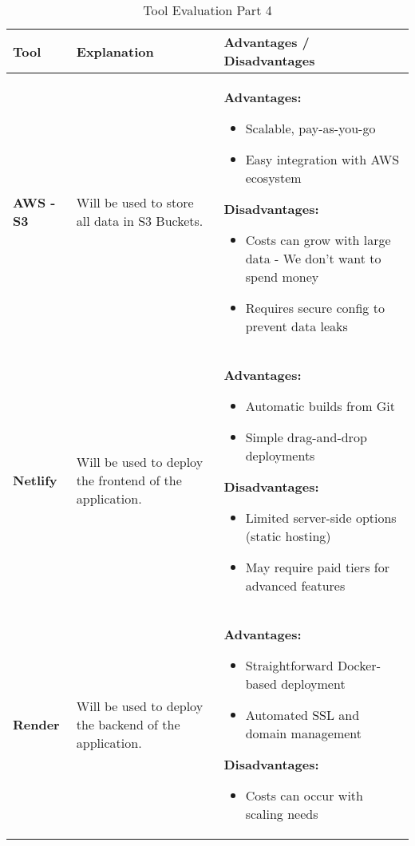 \documentclass{article}
\begin{document}
\begin{table}[htbp]
  \caption{Tool Evaluation Part 4}
  \label{TblToolEval}
  \renewcommand{\arraystretch}{1.2}   %
  \setlength{\tabcolsep}{5pt}         %
  \begin{tabularx}{\textwidth}{p{2cm} p{4cm} X}
  \toprule
  \textbf{Tool} & \textbf{Explanation} & \textbf{Advantages / Disadvantages}\\

  \midrule 

  \textbf{AWS - S3} 
  & Will be used to store all data in S3 Buckets.
  & \textbf{Advantages:}
    \begin{itemize}
      \item Scalable, pay-as-you-go
      \item Easy integration with AWS ecosystem
    \end{itemize}
    \textbf{Disadvantages:}
    \begin{itemize}
      \item Costs can grow with large data - We don't want to spend money
      \item Requires secure config to prevent data leaks
    \end{itemize}
  \\
  \midrule

  \textbf{Netlify} 
  & Will be used to deploy the frontend of the application.
  & \textbf{Advantages:}
    \begin{itemize}
      \item Automatic builds from Git
      \item Simple drag-and-drop deployments
    \end{itemize}
    \textbf{Disadvantages:}
    \begin{itemize}
      \item Limited server-side options (static hosting)
      \item May require paid tiers for advanced features
    \end{itemize}
  \\
  \midrule

  \textbf{Render} 
  & Will be used to deploy the backend of the application.
  & \textbf{Advantages:}
    \begin{itemize}
      \item Straightforward Docker-based deployment
      \item Automated SSL and domain management
    \end{itemize}
    \textbf{Disadvantages:}
    \begin{itemize}
      \item Costs can occur with scaling needs
    \end{itemize}
  \\
  \midrule


\end{tabularx}
\end{table}
\end{document}
